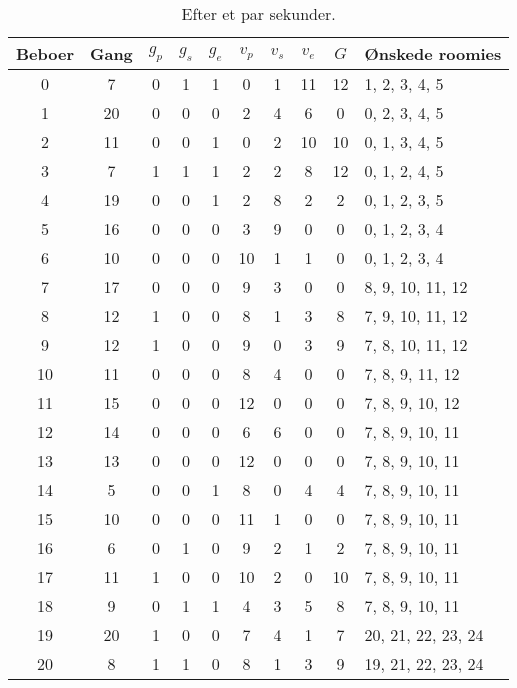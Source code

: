 \documentclass[article,oneside,11pt,a4paper]{memoir}
\newenvironment{assignment}[1]{
\begin{table}[h]
\caption{#1}
\footnotesize
\begin{center}
\begin{tabular}{cccccccccl}
\toprule
Beboer & Gang & $g_p$ & $g_s$ & $g_e$ & $v_p$ & $v_s$ & $v_e$ & $G$ & Ønskede roomies \\ \midrule
}{
\bottomrule
\end{tabular}
\end{center}
\end{table}

}
\begin{document}
\begin{assignment}{Efter et par sekunder.}
     0 &    7 &   0 &   1 &   1 &   0 &   1 &  11 & 12 &  1,  2,  3,  4,  5 \\
     1 &   20 &   0 &   0 &   0 &   2 &   4 &   6 &  0 &  0,  2,  3,  4,  5 \\
     2 &   11 &   0 &   0 &   1 &   0 &   2 &  10 & 10 &  0,  1,  3,  4,  5 \\
     3 &    7 &   1 &   1 &   1 &   2 &   2 &   8 & 12 &  0,  1,  2,  4,  5 \\
     4 &   19 &   0 &   0 &   1 &   2 &   8 &   2 &  2 &  0,  1,  2,  3,  5 \\
     5 &   16 &   0 &   0 &   0 &   3 &   9 &   0 &  0 &  0,  1,  2,  3,  4 \\
     6 &   10 &   0 &   0 &   0 &  10 &   1 &   1 &  0 &  0,  1,  2,  3,  4 \\ \midrule
     7 &   17 &   0 &   0 &   0 &   9 &   3 &   0 &  0 &  8,  9, 10, 11, 12 \\
     8 &   12 &   1 &   0 &   0 &   8 &   1 &   3 &  8 &  7,  9, 10, 11, 12 \\
     9 &   12 &   1 &   0 &   0 &   9 &   0 &   3 &  9 &  7,  8, 10, 11, 12 \\
    10 &   11 &   0 &   0 &   0 &   8 &   4 &   0 &  0 &  7,  8,  9, 11, 12 \\
    11 &   15 &   0 &   0 &   0 &  12 &   0 &   0 &  0 &  7,  8,  9, 10, 12 \\
    12 &   14 &   0 &   0 &   0 &   6 &   6 &   0 &  0 &  7,  8,  9, 10, 11 \\
    13 &   13 &   0 &   0 &   0 &  12 &   0 &   0 &  0 &  7,  8,  9, 10, 11 \\
    14 &    5 &   0 &   0 &   1 &   8 &   0 &   4 &  4 &  7,  8,  9, 10, 11 \\
    15 &   10 &   0 &   0 &   0 &  11 &   1 &   0 &  0 &  7,  8,  9, 10, 11 \\
    16 &    6 &   0 &   1 &   0 &   9 &   2 &   1 &  2 &  7,  8,  9, 10, 11 \\
    17 &   11 &   1 &   0 &   0 &  10 &   2 &   0 & 10 &  7,  8,  9, 10, 11 \\
    18 &    9 &   0 &   1 &   1 &   4 &   3 &   5 &  8 &  7,  8,  9, 10, 11 \\ \midrule
    19 &   20 &   1 &   0 &   0 &   7 &   4 &   1 &  7 & 20, 21, 22, 23, 24 \\
    20 &    8 &   1 &   1 &   0 &   8 &   1 &   3 &  9 & 19, 21, 22, 23, 24 \\

\end{assignment}
\end{document}
